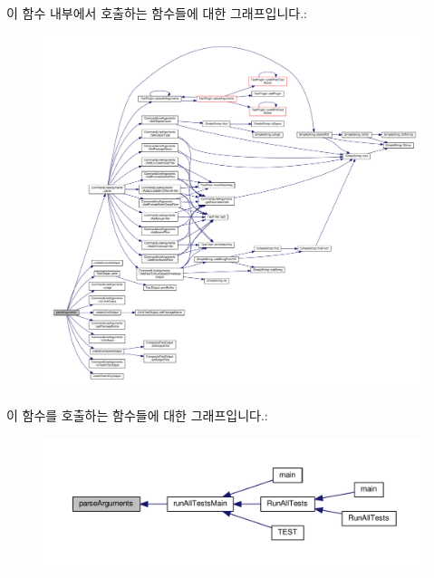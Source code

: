 이 함수 내부에서 호출하는 함수들에 대한 그래프입니다.\+:
\nopagebreak
\begin{figure}[H]
\begin{center}
\leavevmode
\includegraphics[width=350pt]{class_command_line_test_runner_a157b10244193d835756413ccc51a1a4e_cgraph}
\end{center}
\end{figure}




이 함수를 호출하는 함수들에 대한 그래프입니다.\+:
\nopagebreak
\begin{figure}[H]
\begin{center}
\leavevmode
\includegraphics[width=350pt]{class_command_line_test_runner_a157b10244193d835756413ccc51a1a4e_icgraph}
\end{center}
\end{figure}


